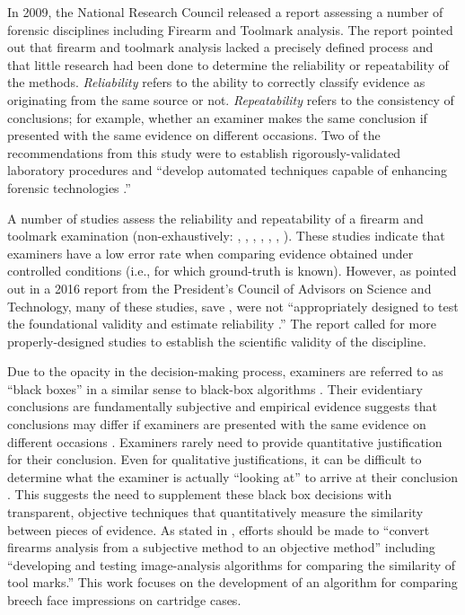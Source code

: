 \documentclass[11pt,]{isuthesis}
\begin{document}
In 2009, the National Research Council released a report assessing a number of forensic disciplines including Firearm and Toolmark analysis.
The report pointed out that firearm and toolmark analysis lacked a precisely defined process and that little research had been done to determine the reliability or repeatability of the methods.
\emph{Reliability} refers to the ability to correctly classify evidence as originating from the same source or not.
\emph{Repeatability} refers to the consistency of conclusions; for example, whether an examiner makes the same conclusion if presented with the same evidence on different occasions.
Two of the recommendations from this study were to establish rigorously-validated laboratory procedures and ``develop automated techniques capable of enhancing forensic technologies \citep{council_strengthening_2009}.''

A number of studies assess the reliability and repeatability of a firearm and toolmark examination (non-exhaustively: \citet{DeFrance2003}, \citet{Hamby2009}, \citet{fadulempirical2011}, \citet{Stroman2014}, \citet{Baldwin2014}, \citet{Smith2016}, \citet{MATTIJSSEN2020}).
These studies indicate that examiners have a low error rate when comparing evidence obtained under controlled conditions (i.e., for which ground-truth is known).
However, as pointed out in a 2016 report from the President's Council of Advisors on Science and Technology, many of these studies, save \citet{Baldwin2014}, were not ``appropriately designed to test the foundational validity and estimate reliability \citep{pcast2016}.''
The report called for more properly-designed studies to establish the scientific validity of the discipline.

Due to the opacity in the decision-making process, examiners are referred to as ``black boxes'' in a similar sense to black-box algorithms \citep{HumanFactorsCommittee2020}.
Their evidentiary conclusions are fundamentally subjective and empirical evidence suggests that conclusions may differ if examiners are presented with the same evidence on different occasions \citep{Ulery2011, Ulery2012}.
Examiners rarely need to provide quantitative justification for their conclusion.
Even for qualitative justifications, it can be difficult to determine what the examiner is actually ``looking at'' to arrive at their conclusion \citep{Ulery2014}.
This suggests the need to supplement these black box decisions with transparent, objective techniques that quantitatively measure the similarity between pieces of evidence.
As stated in \citet{pcast2016}, efforts should be made to ``convert firearms analysis from a subjective method to an objective method'' including ``developing and testing image-analysis algorithms for comparing the similarity of tool marks.''
This work focuses on the development of an algorithm for comparing breech face impressions on cartridge cases.
\end{document}
